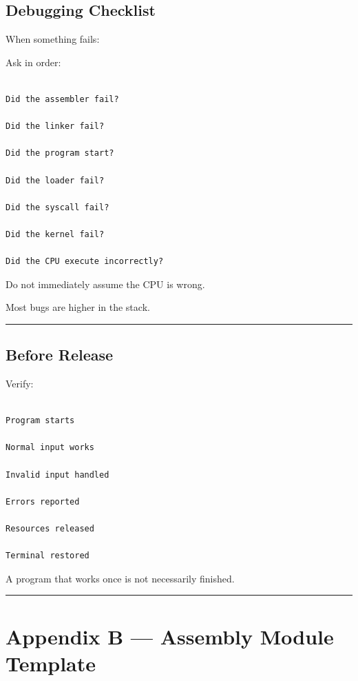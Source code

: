 \documentclass[
  oneside,
  openany]{book}
\begin{document}
\hypertarget{debugging-checklist}{%
\section{Debugging Checklist}\label{debugging-checklist}}

When something fails:

Ask in order:

\begin{verbatim}

Did the assembler fail?

Did the linker fail?

Did the program start?

Did the loader fail?

Did the syscall fail?

Did the kernel fail?

Did the CPU execute incorrectly?
\end{verbatim}

Do not immediately assume the CPU is wrong.

Most bugs are higher in the stack.

\begin{center}\rule{0.5\linewidth}{0.5pt}\end{center}

\hypertarget{before-release}{%
\section{Before Release}\label{before-release}}

Verify:

\begin{verbatim}

Program starts

Normal input works

Invalid input handled

Errors reported

Resources released

Terminal restored
\end{verbatim}

A program that works once is not necessarily finished.

\begin{center}\rule{0.5\linewidth}{0.5pt}\end{center}

\hypertarget{appendix-b-assembly-module-template}{%
\chapter{Appendix B --- Assembly Module
Template}\label{appendix-b-assembly-module-template}}
\end{document}
